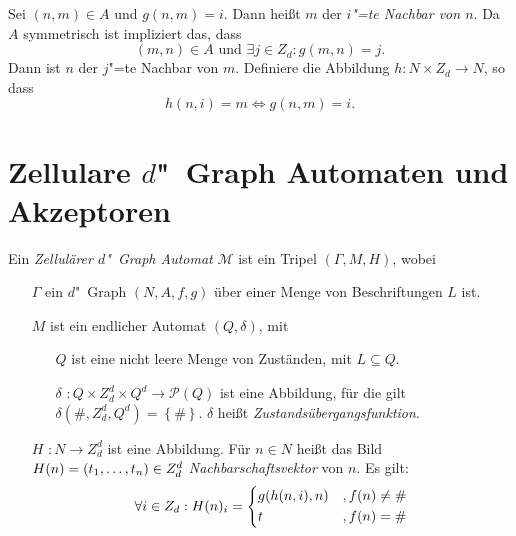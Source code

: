 \documentclass[11pt]{article}
\newcommand{\defWord}[1]{\emph{#1}}
\begin{document}
\begin{definition}[Nachbarschaft]
	Sei $\left(n, m\right) \in A$ und $g\left(n, m\right) = i$. 
	Dann heißt $m$ der \defWord{$i$"=te Nachbar von $n$}.
	Da $A$ symmetrisch ist impliziert das, dass 
	\begin{displaymath}
		\left(m, n\right) \in A \text{ und }\exists j \in Z_d : g(m, n) = j.
	\end{displaymath}
	Dann ist $n$ der $j$"=te Nachbar von $m$. 
	Definiere die Abbildung $h : N \times Z_d \rightarrow N$, so dass
	\begin{displaymath}
		 h(n, i) = m \iff g(n, m) = i.
	\end{displaymath}
\end{definition}

\section{Zellulare $d$"~Graph Automaten und Akzeptoren}

\begin{definition}
	Ein \defWord{Zellulärer $d$"~Graph Automat} $\mathcal{M}$ ist ein Tripel $\left(\Gamma, M, H\right)$, wobei
	\begin{itemize}
		\item[$\Gamma$] ein $d$"~Graph $\left(N, A, f, g\right)$ über einer Menge von Beschriftungen $L$ ist.
		\item[$M$]  ist ein endlicher Automat $\left(Q, \delta\right)$, mit 
		\begin{itemize}
			\item[$Q$] ist eine nicht leere Menge von Zuständen, mit $L \subseteq Q$.
			\item[$\delta$] $: Q \times Z_d^d \times Q^d \rightarrow \mathcal{P}\left(Q\right)$ ist eine Abbildung, für die gilt $\delta \left(\#, Z_d^d, Q^d\right) = \left \{\# \right \}$. $\delta$ heißt \defWord{Zustandsübergangsfunktion}.
		\end{itemize}
		\item[$H$] $: N \rightarrow Z_d^d$ ist eine Abbildung. 
		Für $n \in N$ heißt das Bild $H(n) = \left(t_1, \text{\dots}, t_n\right) \in Z_d^d$ \defWord{Nachbarschaftsvektor} von $n$. Es gilt: 
		\begin{displaymath}
			\forall i \in Z_d : H(n)_i = 
			\begin{dcases}
				g(h(n, i), n) & ,f(n) \neq \# \\
				t & , f(n) = \# \\
			\end{dcases}
		\end{displaymath}
	\end{itemize}
\end{definition}
\end{document}
